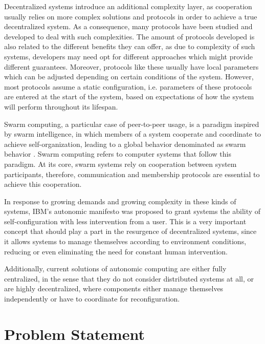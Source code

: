Decentralized systems introduce an additional complexity layer, as cooperation usually relies on more complex solutions and protocols in order to achieve a true decentralized system\cite{Pourebrahimi2005}. As a consequence, many protocols\cite{Leitao2010a, Leitao2007a,Rowstron2001a,Kademlia2002} have been studied and developed to deal with such complexities. The amount of protocols developed is also related to the different benefits they can offer, as due to complexity of such systems, developers may need opt for different approaches which might provide different guarantees. Moreover, protocols like these usually have local parameters which can be adjusted depending on certain conditions of the system. However, most protocols assume a static configuration\cite{Baresi2021}, i.e. parameters of these protocols are entered at the start of the system, based on expectations of how the system will perform throughout its lifespan.

Swarm computing, a particular case of peer-to-peer usage, is a paradigm inspired by swarm intelligence, in which members of a system cooperate and coordinate to achieve self-organization, leading to a global behavior denominated as swarm behavior \cite{Kaur2020}. Swarm computing refers to computer systems that follow this paradigm. At its core, swarm systems rely on cooperation between system participants, therefore, communication and membership protocols are essential to achieve this cooperation.

In response to growing demands and growing complexity in these kinds of systems\cite{Huebscher2008,Parashar2005}, IBM's autonomic manifesto was proposed to grant systems the ability of self-configuration with less intervention from a user\cite{Horn2001}. This is a very important concept that should play a part in the resurgence of decentralized systems, since it allows systems to manage themselves according to environment conditions, reducing or even eliminating the need for constant human intervention.

Additionally, current solutions of autonomic computing are either fully centralized\cite{Hiltunen1999, Garlan2004}, in the sense that they do not consider distributed systems at all, or are highly decentralized\cite{Quin2021}, where components either manage themselves independently or have to coordinate for reconfiguration.
%
%
%
\section*{Problem Statement}
\label{sec:problem_statement}


